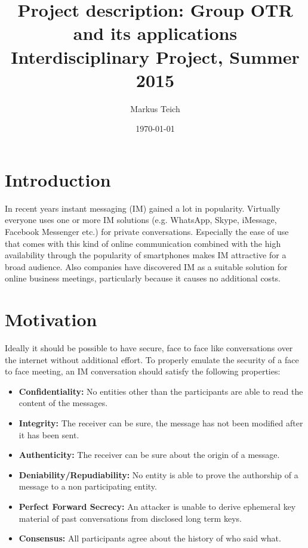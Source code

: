 \documentclass[10pt,a4paper]{article}
\title{Project description: Group OTR and its applications \\ {\small Interdisciplinary Project, Summer 2015}}
\author{Markus Teich}
\date{\today}
\begin{document}
\maketitle


\section{Introduction}

In recent years instant messaging (IM) gained a lot in popularity. Virtually
everyone uses one or more IM solutions (e.g. WhatsApp, Skype, iMessage, Facebook
Messenger etc.) for private conversations. Especially the ease of use that comes
with this kind of online communication combined with the high availability
through the popularity of smartphones makes IM attractive for a broad audience.
Also companies have discovered IM as a suitable solution for online business
meetings, particularly because it causes no additional costs.

\section{Motivation}

Ideally it should be possible to have secure, face to face like conversations
over the internet without additional effort. To properly emulate the security of
a face to face meeting, an IM conversation should satisfy the following
properties:

\begin{itemize}
	\item{\textbf{Confidentiality:} No entities other than the participants are
		able to read the content of the messages.}

	\item{\textbf{Integrity:} The receiver can be sure, the message has not been
		modified after it has been sent.}

	\item{\textbf{Authenticity:} The receiver can be sure about the origin of a
		message.}

	\item{\textbf{Deniability/Repudiability:} No entity is able to prove the
			authorship of a message to a non participating entity.}

	\item{\textbf{Perfect Forward Secrecy:} An attacker is unable to derive
		ephemeral key material of past conversations from disclosed long term
		keys.}

	\item{\textbf{Consensus:} All participants agree about the history of who
		said what.}
\end{itemize}
\end{document}
